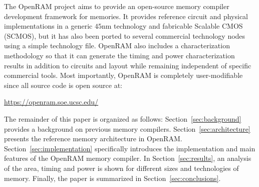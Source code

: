 The OpenRAM project aims to provide an open-source memory compiler
development framework for memories. It provides reference circuit and
physical implementations in a generic $45$nm technology and fabricable
Scalable CMOS (SCMOS), but it has also been ported to several
commercial technology nodes using a simple technology file. OpenRAM
also includes a characterization methodology so that it can generate
the timing and power characterization results in addition to circuits and
layout while remaining independent of specific commercial tools. Most
importantly, OpenRAM is completely user-modifiable since all source
code is open source at:
\begin{center}
\url{https://openram.soe.ucsc.edu/}
\end{center}

The remainder of this paper is organized as follows:
Section~\ref{sec:background} provides a background on previous memory
compilers. Section~\ref{sec:architecture} presents the reference
memory architecture in OpenRAM. Section~\ref{sec:implementation}
specifically introduces the implementation and main features of the
OpenRAM memory compiler. In Section~\ref{sec:results}, an analysis of
the area, timing and power is shown for different sizes and
technologies of memory. Finally, the paper is summarized in
Section~\ref{sec:conclusions}.
